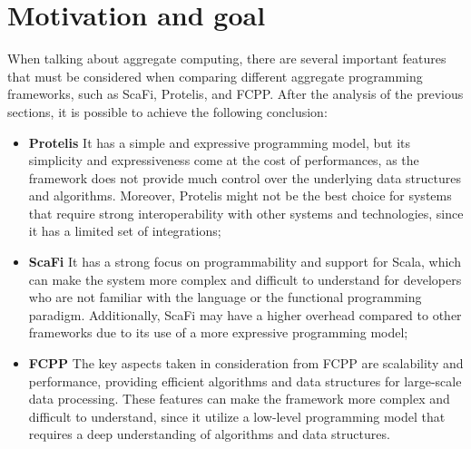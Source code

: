 \section{Motivation and goal}\label{section:motivation_goal}
When talking about aggregate computing, there are several important features that must be considered when comparing different aggregate programming frameworks, such as ScaFi, Protelis, and FCPP.\newline
After the analysis of the previous sections, it is possible to achieve the following conclusion:
\begin{itemize}
    \item \textbf{Protelis}\newline
    It has a simple and expressive programming model, but its simplicity and expressiveness come at the cost of performances, as the framework does not provide much control over the underlying data structures and algorithms. Moreover, Protelis might not be the best choice for systems that require strong interoperability with other systems and technologies, since it has a limited set of integrations;
    \item \textbf{ScaFi}\newline
    It has a strong focus on programmability and support for Scala, which can make the system more complex and difficult to understand for developers who are not familiar with the language or the functional programming paradigm. Additionally, ScaFi may have a higher overhead compared to other frameworks due to its use of a more expressive programming model;
    \item \textbf{FCPP}\newline
    The key aspects taken in consideration from FCPP are scalability and performance, providing efficient algorithms and data structures for large-scale data processing. These features can make the framework more complex and difficult to understand, since it utilize a low-level programming model that requires a deep understanding of algorithms and data structures.
\end{itemize}

